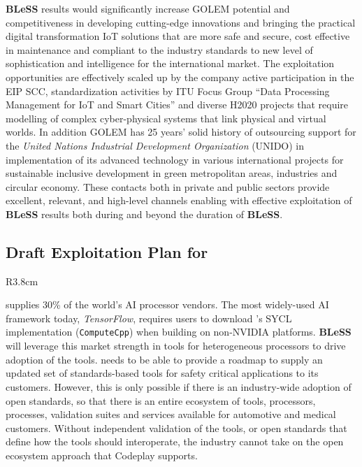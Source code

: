 \documentclass[a4paper,11pt]{article}
\newcommand{\project}[1]{\textbf{#1}\xspace}
\newcommand{\BLESS}{\project{BLeSS}}
\newcommand{\TheProject}{\BLESS}
\begin{document}
\TheProject results would significantly increase GOLEM potential and competitiveness in developing cutting-edge innovations and bringing the practical digital transformation IoT solutions that are more safe and secure, cost effective in maintenance and compliant to the industry standards to new level of sophistication and intelligence for the international market.  
The exploitation opportunities are effectively scaled up by the company active participation in the EIP SCC, standardization activities by ITU Focus Group ``Data Processing Management for IoT and Smart Cities'' and diverse H2020 projects that require modelling of complex cyber-physical systems that link physical and virtual worlds. In addition GOLEM has 25 years' solid history of outsourcing support for the \emph{United Nations Industrial Development Organization} (UNIDO) in implementation of its advanced technology in various international projects for sustainable inclusive development in green metropolitan areas, industries and circular economy. These contacts both in private and public sectors provide excellent, relevant, and high-level channels enabling \GOLEMshort with effective exploitation of \TheProject results both during and beyond the duration of \TheProject.


\horizontalline

\subsection*{Draft Exploitation Plan for \CODEPLAYshort{}}

\begin{wrapfigure}{R}{3.8cm}
\vspace{-1.4cm}
\hfill {}
\vspace{-1cm}
\end{wrapfigure}

\CODEPLAYlong{} supplies 30\% of the world’s AI processor vendors. The most
widely-used AI framework today, \emph{TensorFlow}, requires users to download
\CODEPLAYlong{}’s SYCL implementation (\texttt{ComputeCpp}) when building on
non-NVIDIA platforms. \TheProject will leverage this market strength in
tools for heterogeneous processors to drive adoption of the \CODEPLAY
tools. \CODEPLAY needs to be able to provide a roadmap to supply an
updated set of standards-based tools for safety critical applications to
its customers. However, this is only possible if there is an
industry-wide adoption of open standards, so that there is an entire
ecosystem of tools, processors, processes, validation suites and services
available for automotive and medical customers. Without independent
validation of the tools, or open standards that define how the tools
should interoperate, the industry cannot take on the open ecosystem
approach that Codeplay supports.
\end{document}
